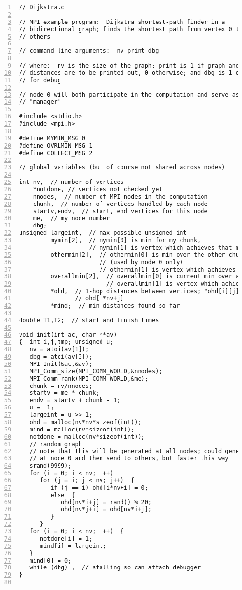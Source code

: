 \begin{Verbatim}[fontsize=\relsize{-2},numbers=left]
// Dijkstra.c

// MPI example program:  Dijkstra shortest-path finder in a
// bidirectional graph; finds the shortest path from vertex 0 to all
// others

// command line arguments:  nv print dbg

// where:  nv is the size of the graph; print is 1 if graph and min
// distances are to be printed out, 0 otherwise; and dbg is 1 or 0, 1
// for debug

// node 0 will both participate in the computation and serve as a
// "manager"

#include <stdio.h>
#include <mpi.h>

#define MYMIN_MSG 0
#define OVRLMIN_MSG 1
#define COLLECT_MSG 2

// global variables (but of course not shared across nodes)

int nv,  // number of vertices
    *notdone, // vertices not checked yet
    nnodes,  // number of MPI nodes in the computation
    chunk,  // number of vertices handled by each node
    startv,endv,  // start, end vertices for this node
    me,  // my node number 
    dbg; 
unsigned largeint,  // max possible unsigned int
         mymin[2],  // mymin[0] is min for my chunk,
                    // mymin[1] is vertex which achieves that min
         othermin[2],  // othermin[0] is min over the other chunks
                       // (used by node 0 only)
                       // othermin[1] is vertex which achieves that min
         overallmin[2],  // overallmin[0] is current min over all nodes,
                         // overallmin[1] is vertex which achieves that min
         *ohd,  // 1-hop distances between vertices; "ohd[i][j]" is
                // ohd[i*nv+j]
         *mind;  // min distances found so far

double T1,T2;  // start and finish times 

void init(int ac, char **av)
{  int i,j,tmp; unsigned u;
   nv = atoi(av[1]);
   dbg = atoi(av[3]);
   MPI_Init(&ac,&av);
   MPI_Comm_size(MPI_COMM_WORLD,&nnodes);
   MPI_Comm_rank(MPI_COMM_WORLD,&me);
   chunk = nv/nnodes;  
   startv = me * chunk; 
   endv = startv + chunk - 1;
   u = -1;
   largeint = u >> 1;
   ohd = malloc(nv*nv*sizeof(int));
   mind = malloc(nv*sizeof(int));
   notdone = malloc(nv*sizeof(int)); 
   // random graph
   // note that this will be generated at all nodes; could generate just
   // at node 0 and then send to others, but faster this way
   srand(9999);
   for (i = 0; i < nv; i++)  
      for (j = i; j < nv; j++)  {
         if (j == i) ohd[i*nv+i] = 0;
         else  {
            ohd[nv*i+j] = rand() % 20;
            ohd[nv*j+i] = ohd[nv*i+j];
         }
      }
   for (i = 0; i < nv; i++)  {
      notdone[i] = 1;
      mind[i] = largeint;
   }
   mind[0] = 0;
   while (dbg) ;  // stalling so can attach debugger
}


\end{Verbatim}
